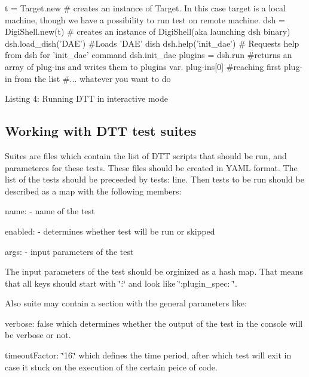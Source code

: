\begin{DoxyCode}
t = Target.new # creates an instance of Target. In \textcolor{keyword}{this} \textcolor{keywordflow}{case} target is a local machine, though we have a 
      possibility to run test on remote machine.
dsh = DigiShell.new(t) # creates an instance of DigiShell(aka launching dsh binary)
dsh.load\_dish(\textcolor{stringliteral}{'DAE'}) #Loads \textcolor{stringliteral}{'DAE'} dish
dsh.help(\textcolor{stringliteral}{'init\_dae'}) # Requests help from dsh \textcolor{keywordflow}{for} \textcolor{stringliteral}{'init\_dae'} command
dsh.init\_dae
plugins = dsh.run #returns an array of plug-ins and writes them to plugins var.
plug-ins[0] #reaching first plug-in from the list
\textcolor{preprocessor}{#... whatever you want to do}
\end{DoxyCode}
 Listing 4\+: Running D\+T\+T in interactive mode



 \hypertarget{a00366_dtt_guide_02_working_with_dtt_test_suites}{}\subsection{Working with D\+T\+T test suites}\label{a00366_dtt_guide_02_working_with_dtt_test_suites}
 Suites are files which contain the list of D\+T\+T scripts that should be run, and parameteres for these tests. These files should be created in Y\+A\+M\+L format. The list of the tests should be preceeded by {\ttfamily tests\+:} line. Then tests to be run should be described as a map with the following members\+:


\begin{DoxyItemize}
\item {\ttfamily name\+: } -\/ name of the test 
\item {\ttfamily enabled\+: } -\/ determines whether test will be run or skipped 
\item {\ttfamily args\+: } -\/ input parameters of the test 
\end{DoxyItemize}

The input parameters of the test should be orginized as a hash map. That means that all keys should start with \char`\"{}\+:\char`\"{} and look like \char`\"{}\+:plugin\+\_\+spec\+: \char`\"{}.

Also suite may contain a section with the general parameters like\+:


\begin{DoxyItemize}
\item {\ttfamily verbose\+: false} which determines whether the output of the test in the console will be verbose or not. 
\item {\ttfamily timeout\+Factor\+: \char`\"{}16.\char`\"{}} which defines the time period, after which test will exit in case it stuck on the execution of the certain peice of code. 
\end{DoxyItemize}

